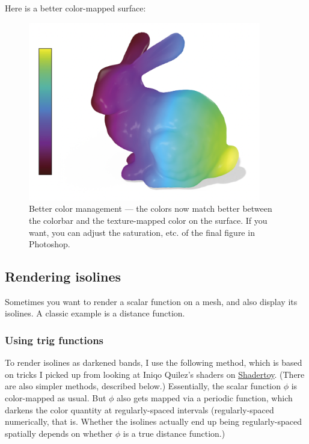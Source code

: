 \documentclass[10pt]{article}
\begin{document}
Here is a better color-mapped surface:
\begin{figure}[H]
    \centering
    \captionsetup{width=0.8\textwidth}
    \includegraphics[width=4in]{images/better-color-management.png}
    \caption{Better color management --- the colors now match better between the colorbar and the texture-mapped color on the surface. If you want, you can adjust the saturation, etc. of the final figure in Photoshop.}
    \label{fig:better-color-management}
\end{figure}

\subsection{Rendering isolines}
Sometimes you want to render a scalar function on a mesh, and also display its isolines. A classic example is a distance function.

\subsubsection{Using trig functions}
To render isolines as darkened bands, I use the following method, which is based on tricks I picked up from looking at Iniqo Quilez's shaders on \href{shadertoy.com}{Shadertoy}. (There are also simpler methods, described below.) Essentially, the scalar function $\phi$ is color-mapped as usual. But $\phi$ also gets mapped via a periodic function, which darkens the color quantity at regularly-spaced intervals (regularly-spaced numerically, that is. Whether the isolines actually end up being regularly-spaced spatially depends on whether $\phi$ is a true distance function.)
\end{document}
